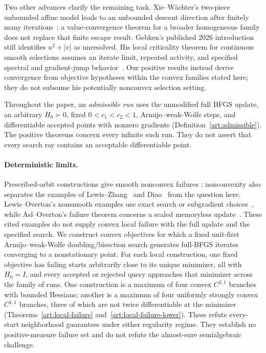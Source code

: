Two other advances clarify the remaining task. Xie--W\"achter's two-piece
unbounded affine model leads to an unbounded descent direction after finitely
many iterations~; a value-convergence theorem
for a broader homogeneous family does not replace that finite escape result.
Gebken's published 2026 introduction still identifies $u^2+|v|$ as unresolved.
His local criticality theorem for continuous smooth selections assumes an
iterate limit, repeated activity, and specified spectral and gradient-jump
behavior~\cite[Theorem~3.1 and (B1)]{BG}. Our positive results instead derive
convergence from objective hypotheses within the convex families stated here;
they do not subsume his potentially nonconvex selection setting.

Throughout the paper, an \emph{admissible run} uses the unmodified full BFGS
update, an arbitrary $H_0\succ0$, fixed $0<c_1<c_2<1$, Armijo--weak-Wolfe
steps, and differentiable accepted points with nonzero gradients
(Definition~\ref{art:admissible}). The positive theorems concern every infinite
such run. They do not assert that every search ray contains an acceptable
differentiable point.

\paragraph{Deterministic limits.}
Prescribed-orbit constructions give smooth nonconvex failures
\cite{NEG_M04,NEG_M07}; nonconvexity also separates the examples of
Lewis--Zhang~\cite{NEG_LZ15} and Diao~ from the
question here. Lewis--Overton's nonsmooth examples use exact search or
subgradient choices~, while Asl--Overton's failure
theorem concerns a scaled memoryless update~\cite{NEG_AO21}. These cited
examples do not supply convex local failure with the full update and the
specified search.
We construct convex objectives for which a fixed unit-first
Armijo--weak-Wolfe doubling/bisection search generates full-BFGS iterates
converging to a nonstationary point. For each local construction, one fixed
objective has failing starts arbitrarily close to its unique minimizer, all
with $H_0=I$, and every accepted or rejected query approaches that minimizer
across the family of runs. One construction is a maximum of four convex
$C^{2,1}$ branches with bounded Hessians; another is a maximum of four
uniformly strongly convex $C^{1,1}$ branches, three of which are not twice
differentiable at the minimizer (Theorems~\ref{art:local-failure}
and~\ref{art:local-failure-lower}). These refute every-start neighborhood
guarantees under either regularity regime. They establish no positive-measure
failure set and do not refute the almost-sure semialgebraic challenge.

